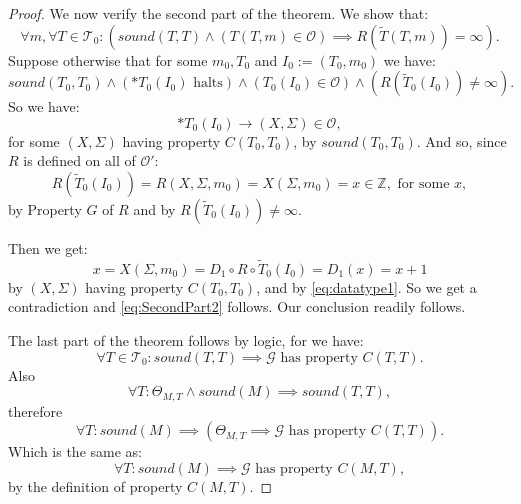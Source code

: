 \documentclass{amsart}  %
\numberwithin{equation}{section}
\theoremstyle{definition}
\theoremstyle{remark}
\begin{document}
{\begin{proof}
We now verify the second part of the theorem. 
We show that: 
\begin{equation} \label{eq:SecondPart2}
      \forall m, \forall T \in \mathcal{T} _{0}:  \left(sound (T,T) \land (T(T,m) \in \mathcal{O}) \implies R (\widetilde{T}(T,m)) = \infty \right).
\end{equation}
Suppose otherwise that for some $m _{0},T _{0}  $ and $I _{0}:= (T _{0} , m _{0}) $ we have: 
\begin{equation*}    sound (T _{0}, T _{0} ) \land (* T _{0} (I _{0}) \text{ halts}) \land (T _{0} (I _{0} ) \in \mathcal{O}) \land (R (\widetilde{T} _{0}   (I _{0} )) \neq \infty).
\end{equation*}
So we have:
\begin{equation} \label{eq:datatype1}
   *T_{0} (I _{0} ) \to (X, \Sigma ) \in \mathcal{O},
\end{equation}
 for some $(X, \Sigma )$ having property $C (T _{0},T _{0} )$, by $sound (T _{0}, T _{0}  )$.
And so, since $R$ is defined on all of $\mathcal{O}'$: $$R (\widetilde{T} _{0}  (I _{0} )) = R (X, \Sigma, m _{0}) =  X (\Sigma,m _{0}  ) =x \in \mathbb{Z}, \text{ for some $x$}, 
$$ 
   by Property $G$ of $R$ and by $R (\widetilde{T} _{0}  (I _{0} )) \neq \infty$.

   Then we get: $$x = X (\Sigma,m _{0}) =  D_1 \circ R \circ \widetilde{T} _{0}  (I _{0} ) = D _{1} (x) =  x+1 $$  by $(X, \Sigma)$ having property $C (T _{0}, T _{0} )$, and by \eqref{eq:datatype1}. So we get a contradiction and \eqref{eq:SecondPart2} follows.
Our conclusion readily follows. 

   The last part of the theorem follows by 
logic, for we have: 
\begin{equation*}
\forall T \in \mathcal{T} _{0}: sound (T,T) \implies \text{$\mathcal{G}$ has property $C (T,T)$}.
\end{equation*}
Also $$\forall T: \Theta _{M,T} \land sound (M) \implies sound (T,T),$$ 
therefore
   $$\forall T: sound (M) \implies (\Theta _{M,T} \implies \mathcal{G} \text{ has property $C (T,T)$}).
   $$ 
Which is the same as:
$$\forall T: sound (M) \implies \mathcal{G} \text{ has property $C (M,T)$},
   $$
by the definition of property $C (M,T)$.

\end{proof}

}
\end{document}
